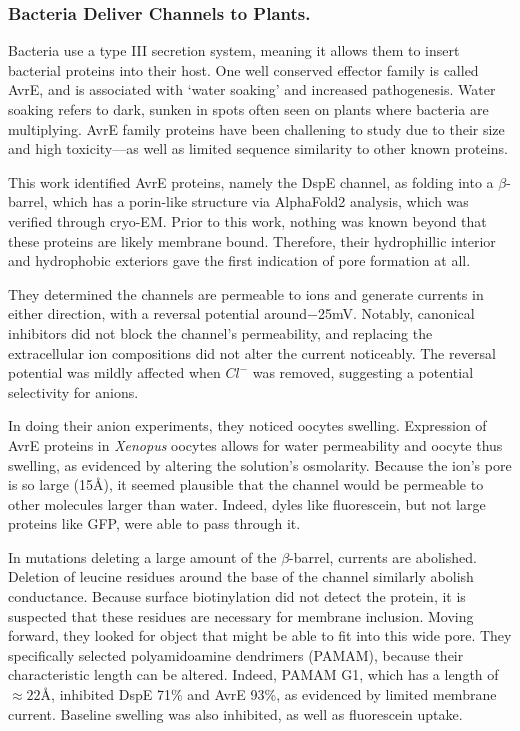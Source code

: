 \documentclass[12pt]{report}
\begin{document}
\subsubsection{Bacteria Deliver Channels to Plants.}
Bacteria use a type III secretion system, meaning it allows them to insert bacterial proteins into their host. One well conserved effector family is called AvrE, and is associated with `water soaking' and increased pathogenesis. Water soaking refers to dark, sunken in spots often seen on plants where bacteria are multiplying. AvrE family proteins have been challening to study due to their size and high toxicity---as well as limited sequence similarity to other known proteins.\newline

This work identified AvrE proteins, namely the DspE channel, as folding into a $\beta$-barrel, which has a porin-like structure via AlphaFold2 analysis, which was verified through cryo-EM. Prior to this work, nothing was known beyond that these proteins are likely membrane bound. Therefore, their hydrophillic interior and hydrophobic exteriors gave the first indication of pore formation at all.\newline

They determined the channels are permeable to ions and generate currents in either direction, with a reversal potential around$-$25mV. Notably, canonical inhibitors did not block the channel's permeability, and replacing the extracellular ion compositions did not alter the current noticeably. The reversal potential was mildly affected when $Cl^-$ was removed, suggesting a potential selectivity for anions.\newline 

In doing their anion experiments, they noticed oocytes swelling. Expression of AvrE proteins in \textit{Xenopus} oocytes allows for water permeability and oocyte thus swelling, as evidenced by altering the solution's osmolarity. Because the ion's pore is so large (15\AA), it seemed plausible that the channel would be permeable to other molecules larger than water. Indeed, dyles like fluorescein, but not large proteins like GFP, were able to pass through it. \newline

In mutations deleting a large amount of the $\beta$-barrel, currents are abolished. Deletion of leucine residues around the base of the channel similarly abolish conductance. Because surface biotinylation did not detect the protein, it is suspected that these residues are necessary for membrane inclusion. Moving forward, they looked for object that might be able to fit into this wide pore. They specifically selected polyamidoamine dendrimers (PAMAM), because their characteristic length can be altered. Indeed, PAMAM G1, which has a length of $\approx 22$\AA, inhibited DspE 71\% and AvrE 93\%, as evidenced by limited membrane current. Baseline swelling was also inhibited, as well as fluorescein uptake.\newline
\end{document}
